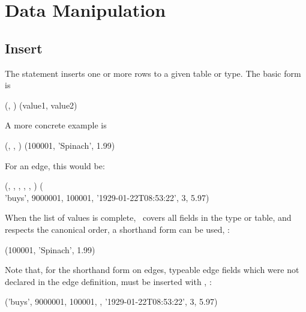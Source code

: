 \section{Data Manipulation}
\subsection{Insert}
The  statement inserts one or more rows
to a given table or type.
The basic form is

  
                      (,
                       )
                      (value1, value2)

A more concrete example is

  
                      (,
                       ,
                       )
                      (100001, 'Spinach', 1.99)

For an edge, this would be:

\begin{minipage}{\textwidth}
  
                      (,
                       ,
                       ,
                       ,
                       ,
                       )
                      (\\
\hspace*{2.99cm}       'buys', 9000001, 100001,
                       '1929-01-22T08:53:22',
                       3, 5.97)
\end{minipage}

When the list of values is complete,
\ie\ covers all fields in the type or table,
and respects the canonical order,
a shorthand form can be used, \eg:

  
                      (100001, 'Spinach', 1.99)

Note that, for the shorthand form on edges,
typeable edge fields which were not declared
in the edge definition, must be inserted with
, \eg:

\begin{minipage}{\textwidth}
  
                      ('buys', 9000001, 100001,
                       ,
                       '1929-01-22T08:53:22',
                       3, 5.97)
\end{minipage}

